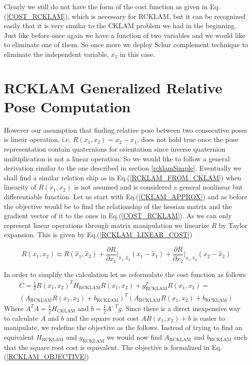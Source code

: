 Clearly we still do not have the form of the cost function as given in Eq.(\ref{COST_RCKLAM}), which is necessary for RCKLAM, but it can be recognized easily that it is very similar to the CKLAM problem we had in the beginning. Just like before once again we have a function of two variables and we would like to eliminate one of them. So once more we deploy Schur complement technique to eliminate the independent variable, $x_2$ in this case.

\section{RCKLAM Generalized Relative Pose Computation}
However our assumption that finding relative pose between two consecutive poses is linear operation, i.e. $R(x_1, x_2) = x_2 - x_1$, does not hold true once the pose representation contain quaternions for orientation since inverse quaternion multiplication is not a linear operation. So we would like to follow a general derivation similar to the one described in section \ref{rcklamSimple}. Eventually we shall find a similar relation ship as in Eq.(\ref{RCKLAM_FROM_CKLAM}) when linearity of $R(x_1, x_2)$ is not assumed and is considered a general nonlinear but differentiable function. Let us start with Eq.(\ref{CKLAM_APPROX}) and as before the objective would be to find the relationship of the hessian matrix and the gradient vector of it to the ones in Eq.(\ref{COST_RCKLAM}). As we can only represent linear operations through matrix manipulation we linearize $R$ by Taylor expansion. This is given by Eq.(\ref{RCKLAM_LINEAR_COST})

\begin{equation}
  R(x_1, x_2) \approx R(\hat x_1, \hat x_2) + \frac{\partial R} {\partial x_1}\biggr\rvert_{\hat x_1, \hat x_2} (x_1 - \hat x_1)+ \frac{\partial R} {\partial x_2}\biggr\rvert_{\hat x_1, \hat x_2} (x_2 - \hat x_2)
	\label{RCKLAM_LINEAR_COST}
\end{equation}

In order to simplify the calculation let us reformulate the cost function as follows
\begin{equation}
  \begin{split}
    C = \frac{1}{2}R(x_1, x_2)^TH_\mathrm{RCKLAM}R(x_1, x_2) + g_\mathrm{RCKLAM}^TR(x_1, x_2) = \\ (A_\mathrm{RCKLAM}R(x_1, x_2) + b_\mathrm{RCKLAM})^T(A_\mathrm{RCKLAM}R(x_1, x_2) + b_\mathrm{RCKLAM})
    \label{COST_RCKLAM_FACTORIZED}
    \end{split}
\end{equation}
 Where $A^TA = \frac{1}{2}H_\mathrm{CKLAM}$ and $b = \frac{1}{2} A^{-T}g$. Since there is a direct inexpensive way to calculate $A$ and $b$ and the square root cost $AR(x_1, x_2) + b$ is easier to manipulate, we redefine the objective as the follows. Instead of trying to find an equivalent $H_\mathrm{RCKLAM}$ and $g_\mathrm{RCKLAM}$ we would now find $A_\mathrm{RCKLAM}$ and $b_\mathrm{RCKLAM}$ such that the square root cost is equivalent. The objective is formalized in Eq.(\ref{RCKLAM_OBJECTIVE})

